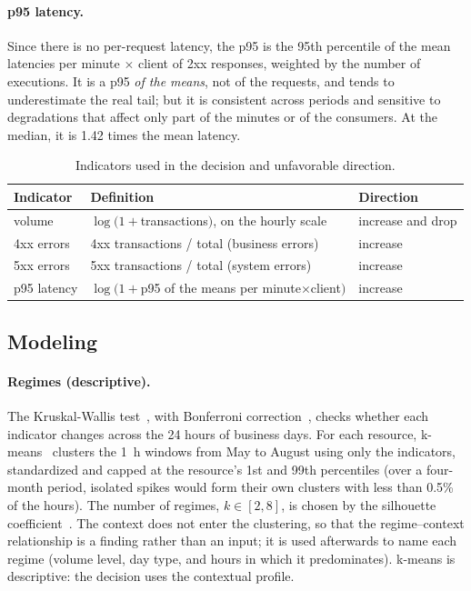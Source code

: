 \documentclass[sigconf,nonacm]{acmart}
\begin{document}
\paragraph{p95 latency.} Since there is no per-request latency, the p95 is the 95th percentile of the mean latencies per minute $\times$ client of 2xx responses, weighted by the number of executions. It is a p95 \emph{of the means}, not of the requests, and tends to underestimate the real tail; but it is consistent across periods and sensitive to degradations that affect only part of the minutes or of the consumers. At the median, it is 1.42 times the mean latency.


\begin{table}[t]
  \caption{Indicators used in the decision and unfavorable direction.}
  \label{tab:atributos}
  \small
  \begin{tabular}{p{}p{}p{}}
    \toprule
    Indicator & Definition & Direction \\
    \midrule
    volume & $\log(1+$transactions$)$, on the hourly scale & increase and drop \\
    4xx errors & 4xx transactions / total (business errors) & increase \\
    5xx errors & 5xx transactions / total (system errors) & increase \\
    p95 latency & $\log(1+$p95 of the means per minute$\times$client$)$ & increase \\
    \bottomrule
  \end{tabular}
\end{table}

\subsection{Modeling}

\paragraph{Regimes (descriptive).} The Kruskal-Wallis test~\citep{kruskal1952ranks}, with Bonferroni correction~\citep{dunn1961multiple}, checks whether each indicator changes across the 24 hours of business days. For each resource, k-means~\citep{lloyd1982kmeans} clusters the 1~h windows from May to August using only the indicators, standardized and capped at the resource's 1st and 99th percentiles (over a four-month period, isolated spikes would form their own clusters with less than 0.5\% of the hours). The number of regimes, $k\in[2,8]$, is chosen by the silhouette coefficient~\citep{rousseeuw1987silhouette}. The context does not enter the clustering, so that the regime--context relationship is a finding rather than an input; it is used afterwards to name each regime (volume level, day type, and hours in which it predominates). k-means is descriptive: the decision uses the contextual profile.
\end{document}
